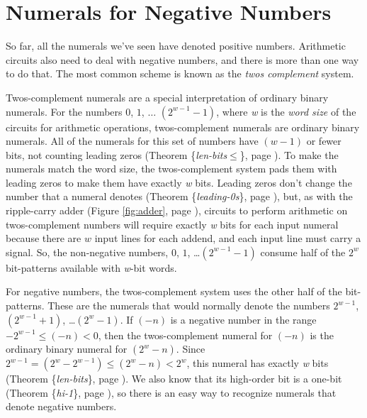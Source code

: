\section{Numerals for Negative Numbers}
\label{sec:negative-numerals}

So far, all the numerals we've seen have denoted positive numbers.
Arithmetic circuits also need to deal with negative numbers,
and there is more than one way to do that.
The most common scheme is known as the \emph{twos complement} system.

Twos-complement
numerals are a special interpretation of
ordinary binary numerals.
For the numbers $0$, $1$, $\dots$ $(2^{w-1}-1)$,
where \emph{w} is the \emph{word size}
of the circuits for arithmetic operations,
twos-complement numerals are ordinary binary numerals.
All of the numerals for this set of numbers
have $(w-1)$ or fewer bits,
not counting leading zeros
(Theorem \{\emph{len-bits}$\le$\}, page \pageref{len-bitsLE}).
To make the numerals match the word size,
the twos-complement system pads them with leading zeros
to make them have exactly \emph{w} bits.
Leading zeros don't change the number that a numeral denotes
(Theorem \{\emph{leading-0s}\}, page \pageref{leading-0s}), but,
as with the ripple-carry adder (Figure \ref{fig:adder}, page \pageref{fig:adder}),
circuits to perform arithmetic on twos-complement numbers will
require exactly \emph{w} bits for each input numeral
because there are $w$ input lines for each addend,
and each input line must carry a signal.
So, the non-negative numbers, $0$, $1$, \dots $(2^{w-1}-1)$
consume half of the $2^w$ bit-patterns available with
\emph{w}-bit words.

For negative numbers,
the twos-complement system uses the other half of the bit-patterns.
These are the numerals that would normally denote the numbers
$2^{w-1}$, $(2^{w-1}+1)$, \dots $(2^{w}-1)$.
If $(-n)$ is a negative number in the range $-2^{w-1} \leq (-n) < 0$,
\label{2s-def}
then the twos-complement numeral for $(-n)$
is the ordinary binary numeral for $(2^w - n)$.
Since $2^{w-1} = (2^{w}-2^{w-1}) \leq (2^w - n) < 2^w$,
this numeral has exactly \emph{w} bits
(Theorem \{\emph{len-bits}\}, page \pageref{len-bits}).
We also know that its high-order bit is a one-bit
(Theorem \{\emph{hi-1}\}, page \pageref{hi-1}),
so there is an easy way to recognize numerals that denote negative numbers.

